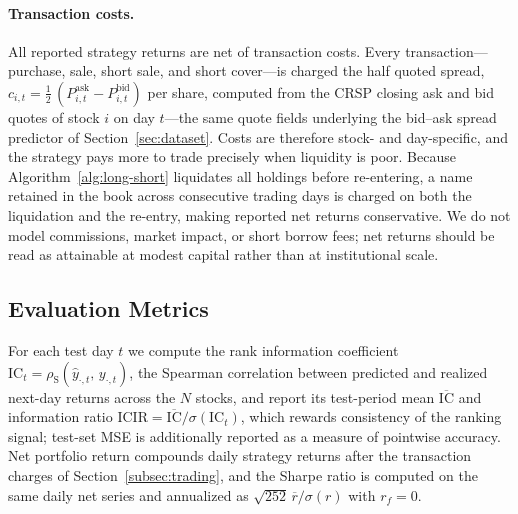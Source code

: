 \paragraph{Transaction costs.} All reported strategy returns are net of transaction costs. Every transaction---purchase, sale, short sale, and short cover---is charged the half quoted spread, $c_{i,t}=\tfrac{1}{2}\,(P^{\mathrm{ask}}_{i,t}-P^{\mathrm{bid}}_{i,t})$ per share, computed from the CRSP closing ask and bid quotes of stock $i$ on day $t$---the same quote fields underlying the bid--ask spread predictor of Section~\ref{sec:dataset}. Costs are therefore stock- and day-specific, and the strategy pays more to trade precisely when liquidity is poor. Because Algorithm~\ref{alg:long-short} liquidates all holdings before re-entering, a name retained in the book across consecutive trading days is charged on both the liquidation and the re-entry, making reported net returns conservative. We do not model commissions, market impact, or short borrow fees; net returns should be read as attainable at modest capital rather than at institutional scale.

\subsection{Evaluation Metrics}
\label{subsec:metrics}

For each test day $t$ we compute the rank information coefficient $\mathrm{IC}_t=\rho_{\mathrm{S}}(\hat{y}_{\cdot,t},\,y_{\cdot,t})$, the Spearman correlation between predicted and realized next-day returns across the $N$ stocks, and report its test-period mean $\overline{\mathrm{IC}}$ and information ratio $\mathrm{ICIR}=\overline{\mathrm{IC}}/\sigma(\mathrm{IC}_t)$, which rewards consistency of the ranking signal; test-set MSE is additionally reported as a measure of pointwise accuracy. Net portfolio return compounds daily strategy returns after the transaction charges of Section~\ref{subsec:trading}, and the Sharpe ratio is computed on the same daily net series and annualized as $\sqrt{252}\,\overline{r}/\sigma(r)$ with $r_f{=}0$.